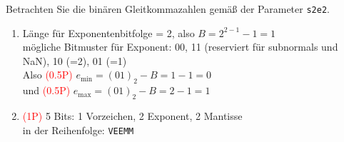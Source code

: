  Betrachten Sie die binären Gleitkommazahlen gemäß der Parameter \texttt{s2e2}.
	\begin{enumerate}
		\item  Länge für Exponentenbitfolge = 2, also  $B = 2^{2-1}-1 = 1$\\
		mögliche Bitmuster für Exponent: 00, 11 (reserviert für subnormals und NaN), 10 (=2), 01 (=1)\\
		Also \textcolor{red}{(0.5P)} $e_{\text{min}} = (01)_2 - B = 1- 1 = 0$\\
		und \textcolor{red}{(0.5P)} $e_{\text{max}}= (01)_2 - B = 2- 1 = 1$ 
		\item \textcolor{red}{(1P)} 5 Bits: 1 Vorzeichen, 2 Exponent, 2 Mantisse \\ in der Reihenfolge: \texttt{VEEMM}
	\end{enumerate}

